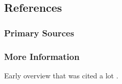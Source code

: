 \begin{bibunit}
\subsection{References}

\subsubsection{Primary Sources}



\subsubsection{More Information}

Early overview that was cited a lot \cite{Dietterich2000}.

\putbib
\end{bibunit}


\newpage\begin{bibunit}\putbib\end{bibunit}
\newpage\begin{bibunit}\putbib\end{bibunit}
\newpage\begin{bibunit}\putbib\end{bibunit}
\newpage\begin{bibunit}\putbib\end{bibunit}

